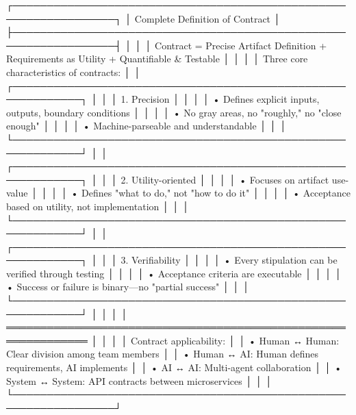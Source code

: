 \documentclass[
]{article}
\newenvironment{Shaded}{}{}
\newcommand{\NormalTok}[1]{#1}
\begin{document}
\begin{Shaded}
\begin{Highlighting}[]
\NormalTok{┌─────────────────────────────────────────────────────────────────┐}
\NormalTok{│                 Complete Definition of Contract                  │}
\NormalTok{├─────────────────────────────────────────────────────────────────┤}
\NormalTok{│                                                                  │}
\NormalTok{│  Contract = Precise Artifact Definition + Requirements as Utility + Quantifiable \& Testable │}
\NormalTok{│                                                                  │}
\NormalTok{│  Three core characteristics of contracts:                       │}
\NormalTok{│  ┌────────────────────────────────────────────────────────────┐ │}
\NormalTok{│  │ 1. Precision                                               │ │}
\NormalTok{│  │    • Defines explicit inputs, outputs, boundary conditions │ │}
\NormalTok{│  │    • No gray areas, no "roughly," no "close enough"        │ │}
\NormalTok{│  │    • Machine{-}parseable and understandable                  │ │}
\NormalTok{│  └────────────────────────────────────────────────────────────┘ │}
\NormalTok{│  ┌────────────────────────────────────────────────────────────┐ │}
\NormalTok{│  │ 2. Utility{-}oriented                                        │ │}
\NormalTok{│  │    • Focuses on artifact use{-}value                         │ │}
\NormalTok{│  │    • Defines "what to do," not "how to do it"              │ │}
\NormalTok{│  │    • Acceptance based on utility, not implementation       │ │}
\NormalTok{│  └────────────────────────────────────────────────────────────┘ │}
\NormalTok{│  ┌────────────────────────────────────────────────────────────┐ │}
\NormalTok{│  │ 3. Verifiability                                           │ │}
\NormalTok{│  │    • Every stipulation can be verified through testing     │ │}
\NormalTok{│  │    • Acceptance criteria are executable                    │ │}
\NormalTok{│  │    • Success or failure is binary—no "partial success"     │ │}
\NormalTok{│  └────────────────────────────────────────────────────────────┘ │}
\NormalTok{│                                                                  │}
\NormalTok{│  ══════════════════════════════════════════════════════════════  │}
\NormalTok{│                                                                  │}
\NormalTok{│  Contract applicability:                                        │}
\NormalTok{│  • Human ↔ Human: Clear division among team members            │}
\NormalTok{│  • Human ↔ AI: Human defines requirements, AI implements       │}
\NormalTok{│  • AI ↔ AI: Multi{-}agent collaboration                          │}
\NormalTok{│  • System ↔ System: API contracts between microservices        │}
\NormalTok{│                                                                  │}
\NormalTok{└─────────────────────────────────────────────────────────────────┘}
\end{Highlighting}
\end{Shaded}
\end{document}
